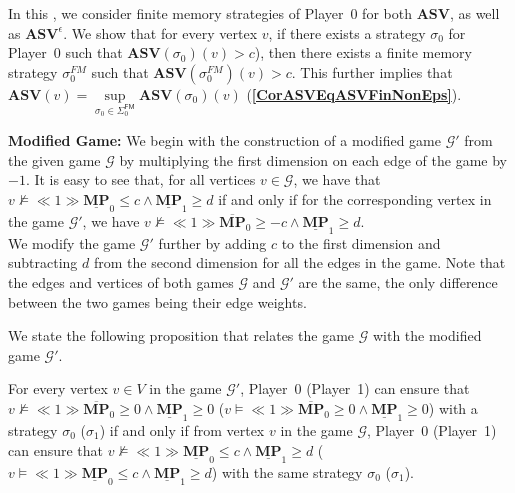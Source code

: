 In this \mychapter, we consider finite memory strategies of Player~$0$ for both $\mathbf{ASV}$, as well as $\mathbf{ASV}^\epsilon$. We show that for every vertex $v$, if there exists a strategy $\sigma_0$ for Player~0 such that $\mathbf{ASV}(\sigma_0)(v) > c$), then there exists a finite memory strategy $\sigma_0^{FM}$ such that $\mathbf{ASV}(\sigma_0^{FM})(v) > c$. This further implies that $\mathbf{ASV}(v) = \sup\limits_{\sigma_0 \in \Sigma_0^{\mathsf{FM}}} \mathbf{ASV}(\sigma_0)(v)$ (\textbf{\cref{CorASVEqASVFinNonEps}}).

\textbf{Modified Game:} We begin with the construction of a modified game $\mathcal{G'}$ from the given game $\mathcal{G}$ by multiplying the first dimension on each edge of the game by $-1$. It is easy to see that, for all vertices $v \in \mathcal{G}$, we have that $v \nvDash \ll 1 \gg \underline{\mathbf{MP}}_0 \leqslant c \land \underline{\mathbf{MP}}_1 \geqslant d$ if and only if for the corresponding vertex in the game $\mathcal{G'}$, we have $v \nvDash \ll 1 \gg \overline{\mathbf{MP}}_0 \geqslant -c \land \underline{\mathbf{MP}}_1 \geqslant d$.\\ 
\noindent We modify the game $\mathcal{G'}$ further by adding $c$ to the first dimension and subtracting $d$ from the second dimension for all the edges in the game. Note that the edges and vertices of both games $\mathcal{G}$ and $\mathcal{G'}$ are the same, the only difference between the two games being their edge weights.

We state the following proposition that relates the game $\mathcal{G}$ with the modified game $\mathcal{G'}$.

\begin{proposition}
\label{PropGameStrEqNewGameStrNonEps}
For every vertex $v \in V$ in the game $\mathcal{G'}$, Player~0 (Player~1) can ensure that $v \nvDash \ll 1 \gg \overline{\mathbf{MP}}_0 \geqslant 0 \land \underline{\mathbf{MP}}_1 \geqslant 0$ ($v \models \ll 1 \gg \overline{\mathbf{MP}}_0 \geqslant 0 \land \underline{\mathbf{MP}}_1 \geqslant 0$) with a strategy $\sigma_0$ ($\sigma_1$) if and only if from vertex $v$ in the game $\mathcal{G}$, Player~0 (Player~1) can ensure that $v \nvDash \ll 1 \gg \underline{\mathbf{MP}}_0 \leqslant c \land \underline{\mathbf{MP}}_1 \geqslant d$ ($v \models \ll 1 \gg \underline{\mathbf{MP}}_0 \leqslant c \land \underline{\mathbf{MP}}_1 \geqslant d$) with the same strategy $\sigma_0$ ($\sigma_1$).
\end{proposition}

